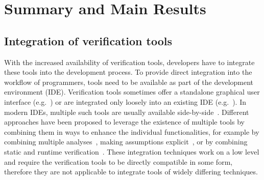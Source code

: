 \section{Summary and Main Results}


\subsection{Integration of verification tools}

With the increased availability of verification tools, developers have to integrate these tools into the development process.
To provide direct integration into the workflow of programmers, tools need to be available as part of the development environment (IDE).
Verification tools sometimes offer a standalone graphical user interface (e.g.~\cite{CUOQ12,FILLIATRE13}) or are integrated only loosely into an existing IDE (e.g.~\cite{BARNES03,COK11,LOGOZZO12}). In modern IDEs, multiple such tools are usually available side-by-side~\cite{VISUALSTUDIO,SPARKPRO,EIFFELSTUDIO}.
Different approaches have been proposed to leverage the existence of multiple tools by combining them in ways to enhance the individual functionalities, for example by combining multiple analyses~\cite{CORRENSON12}, making assumptions explicit~\cite{CHRISTAKIS12}, or by combining static and runtime verification~\cite{AHRENDT12}.
These integration techniques work on a low level and require the verification tools to be directly compatible in some form, therefore they are not applicable to integrate tools of widely differing techniques.


